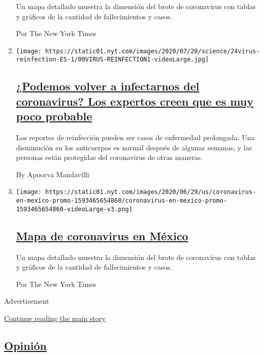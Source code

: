 \begin{enumerate}
  Un mapa detallado muestra la dimensión del brote de coronavirus con
  tablas y gráficos de la cantidad de fallecimientos y casos.

  Por The New York Times
\item
  \texttt{[image: https://static01.nyt.com/images/2020/07/20/science/24virus-reinfection-ES-1/00VIRUS-REINFECTION1-videoLarge.jpg]}

  \hypertarget{podemos-volver-a-infectarnos-del-coronavirus-los-expertos-creen-que-es-muy-poco-probable}{%
  \subsection{\texorpdfstring{\href{/es/2020/07/24/espanol/ciencia-y-tecnologia/reinfeccion-coronavirus.html}{¿Podemos
  volver a infectarnos del coronavirus? Los expertos creen que es muy
  poco
  probable}}{¿Podemos volver a infectarnos del coronavirus? Los expertos creen que es muy poco probable}}\label{podemos-volver-a-infectarnos-del-coronavirus-los-expertos-creen-que-es-muy-poco-probable}}

  Los reportes de reinfección pueden ser casos de enfermedad prolongada.
  Una disminución en los anticuerpos es normal después de algunas
  semanas, y las personas están protegidas del coronavirus de otras
  maneras.

  By Apoorva Mandavilli
\item
  \texttt{[image: https://static01.nyt.com/images/2020/06/29/us/coronavirus-en-mexico-promo-1593465654860/coronavirus-en-mexico-promo-1593465654860-videoLarge-v3.png]}

  \hypertarget{mapa-de-coronavirus-en-muxe9xico}{%
  \subsection{\texorpdfstring{\href{/es/interactive/2020/espanol/america-latina/coronavirus-en-mexico.html}{Mapa
  de coronavirus en
  México}}{Mapa de coronavirus en México}}\label{mapa-de-coronavirus-en-muxe9xico}}

  Un mapa detallado muestra la dimensión del brote de coronavirus con
  tablas y gráficos de la cantidad de fallecimientos y casos.

  Por The New York Times
\end{enumerate}

Advertisement

\protect\hyperlink{after-mid1}{Continue reading the main story}

\hypertarget{opiniuxf3n}{%
\subsection{\texorpdfstring{\href{/es/section/opinion}{Opinión}}{Opinión}}\label{opiniuxf3n}}

